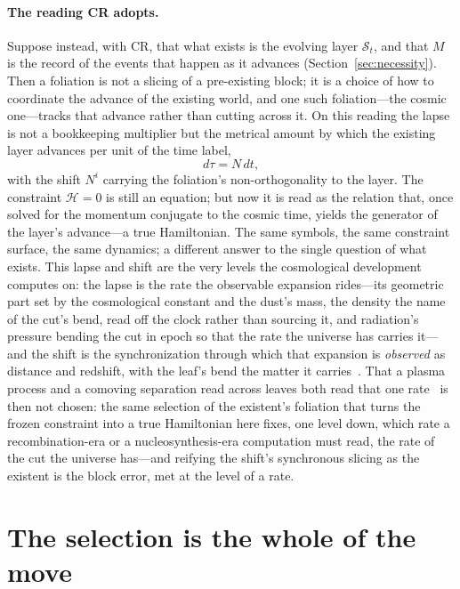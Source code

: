 \documentclass[11pt,a4paper]{article}
\theoremstyle{plain}
\theoremstyle{definition}
\theoremstyle{remark}
\newcommand{\St}{\mathcal{S}_t}
\begin{document}
\paragraph{The reading CR adopts.}
Suppose instead, with CR, that what exists is the evolving layer $\St$, and that $M$ is the record of the events that happen as it advances (Section~\ref{sec:necessity}). Then a foliation is not a slicing of a pre-existing block; it is a choice of how to coordinate the advance of the existing world, and one such foliation---the cosmic one---tracks that advance rather than cutting across it. On this reading the lapse is not a bookkeeping multiplier but the metrical amount by which the existing layer advances per unit of the time label,
\begin{equation}
d\tau = N\,dt,
\end{equation}
with the shift $N^i$ carrying the foliation's non-orthogonality to the layer. The constraint $\mathcal{H}=0$ is still an equation; but now it is read as the relation that, once solved for the momentum conjugate to the cosmic time, yields the generator of the layer's advance---a true Hamiltonian. The same symbols, the same constraint surface, the same dynamics; a different answer to the single question of what exists. This lapse and shift are the very levels the cosmological development computes on: the lapse is the rate the observable expansion rides---its geometric part set by the cosmological constant and the dust's mass, the density the name of the cut's bend, read off the clock rather than sourcing it, and radiation's pressure bending the cut in epoch so that the rate the universe has carries it---and the shift is the synchronization through which that expansion is \emph{observed} as distance and redshift, with the leaf's bend the matter it carries~\cite{JanzenOperator, JanzenCosmogenesis}. That a plasma process and a comoving separation read across leaves both read that one rate~\cite{JanzenCRcosmology} is then not chosen: the same selection of the existent's foliation that turns the frozen constraint into a true Hamiltonian here fixes, one level down, which rate a recombination-era or a nucleosynthesis-era computation must read, the rate of the cut the universe has---and reifying the shift's synchronous slicing as the existent is the block error, met at the level of a rate.

\section{The selection is the whole of the move}\label{sec:selection}
\end{document}

